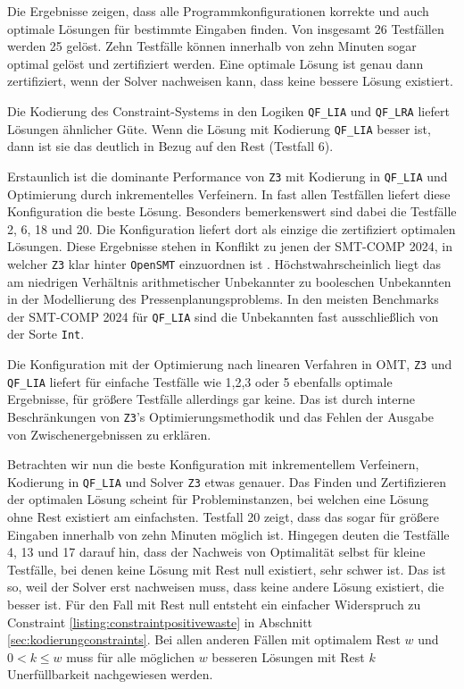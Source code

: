 Die Ergebnisse zeigen, dass alle Programmkonfigurationen korrekte und auch optimale Lösungen für bestimmte Eingaben finden.
Von insgesamt 26 Testfällen werden 25 gelöst.
Zehn Testfälle können innerhalb von zehn Minuten sogar optimal gelöst und zertifiziert werden.
Eine optimale Lösung ist genau dann zertifiziert, wenn der Solver nachweisen kann, dass keine bessere Lösung existiert.

Die Kodierung des Constraint-Systems in den Logiken \texttt{QF\_LIA} und \texttt{QF\_LRA} liefert Lösungen ähnlicher Güte.
Wenn die Lösung mit Kodierung \texttt{QF\_LIA} besser ist, dann ist sie das deutlich in Bezug auf den Rest (Testfall 6).

Erstaunlich ist die dominante Performance von \texttt{Z3} mit Kodierung in \texttt{QF\_LIA} und Optimierung durch inkrementelles Verfeinern.
In fast allen Testfällen liefert diese Konfiguration die beste Lösung.
Besonders bemerkenswert sind dabei die Testfälle 2, 6, 18 und 20.
Die Konfiguration liefert dort als einzige die zertifiziert optimalen Lösungen.
Diese Ergebnisse stehen in Konflikt zu jenen der SMT-COMP 2024, in welcher \texttt{Z3} klar hinter \texttt{OpenSMT} einzuordnen ist \cite{smtcomp2024results}.
Höchstwahrscheinlich liegt das am niedrigen Verhältnis arithmetischer Unbekannter zu booleschen Unbekannten in der Modellierung des Pressenplanungsproblems.
In den meisten Benchmarks der SMT-COMP 2024 für \texttt{QF\_LIA} sind die Unbekannten fast ausschließlich von der Sorte \texttt{Int}.

Die Konfiguration mit der Optimierung nach linearen Verfahren in OMT, \texttt{Z3} und \texttt{QF\_LIA}
liefert für einfache Testfälle wie 1,2,3 oder 5 ebenfalls optimale Ergebnisse, für größere Testfälle allerdings gar keine.
Das ist durch interne Beschränkungen von \texttt{Z3}'s Optimierungsmethodik und das Fehlen der Ausgabe von Zwischenergebnissen zu erklären.

Betrachten wir nun die beste Konfiguration mit inkrementellem Verfeinern, Kodierung in \texttt{QF\_LIA} und Solver \texttt{Z3} etwas genauer.
Das Finden und Zertifizieren der optimalen Lösung scheint für Probleminstanzen, bei welchen eine Lösung ohne Rest existiert am einfachsten.
Testfall 20 zeigt, dass das sogar für größere Eingaben innerhalb von zehn Minuten möglich ist.
Hingegen deuten die Testfälle 4, 13 und 17 darauf hin, dass der Nachweis von Optimalität selbst für kleine Testfälle,
bei denen keine Lösung mit Rest null existiert, sehr schwer ist.
Das ist so, weil der Solver erst nachweisen muss, dass keine andere Lösung existiert, die besser ist.
Für den Fall mit Rest null entsteht ein einfacher Widerspruch zu Constraint \ref{listing:constraintpositivewaste} in Abschnitt \ref{sec:kodierungconstraints}.
Bei allen anderen Fällen mit optimalem Rest $w$ und $0 < k \leq w$ muss für alle möglichen $w$ besseren Lösungen mit Rest $k$ Unerfüllbarkeit nachgewiesen werden.

